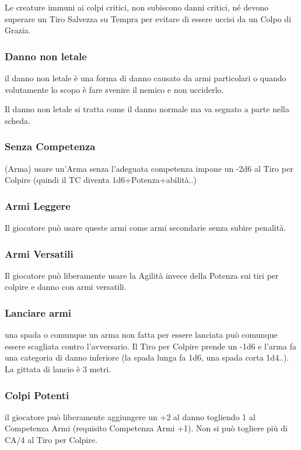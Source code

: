 \documentclass[a4paper,11pt,twoside,openany]{book}
\begin{document}
Le creature immuni ai colpi critici, non subiscono danni critici, né devono superare un Tiro Salvezza su Tempra per evitare di essere uccisi da un Colpo di Grazia.

\subsubsection{Danno non letale} il danno non letale è una forma di danno causato da armi particolari o quando volutamente lo scopo è fare svenire il nemico e non ucciderlo.

Il danno non letale si tratta come il danno normale ma va segnato a parte nella scheda.

\subsubsection{Senza Competenza} (Arma) usare un'Arma senza l'adeguata competenza impone un -2d6 al Tiro per Colpire (quindi il TC diventa 1d6+Potenza+abilità..)

\subsubsection{Armi Leggere} Il giocatore può usare queste armi come armi secondarie senza subire penalità.

\subsubsection{Armi Versatili} Il giocatore può liberamente usare la Agilità invece della Potenza sui tiri per colpire e danno con armi versatili.

\subsubsection{Lanciare armi} una spada o comunque un arma non fatta per essere lanciata può comunque essere scagliata contro l'avversario.
Il Tiro per Colpire prende un -1d6 e l'arma fa una categoria di danno inferiore (la spada lunga fa 1d6, una spada corta 1d4..). La gittata di lancio è 3 metri.

\subsubsection{Colpi Potenti} il giocatore può liberamente aggiungere un +2 al danno togliendo 1 al Competenza Armi (requisito Competenza Armi +1). Non si può togliere più di CA/4 al Tiro per Colpire.
\end{document}
